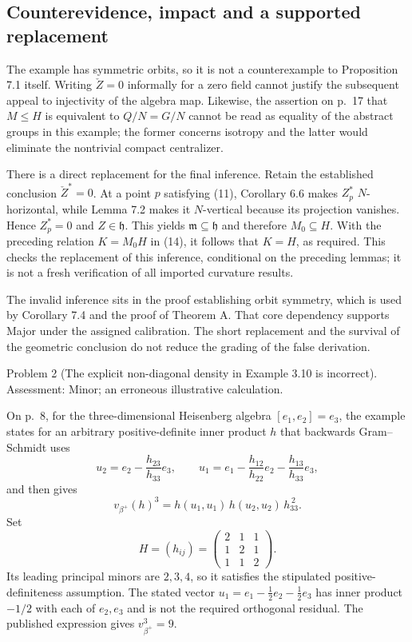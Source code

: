 \documentclass[10pt]{article}
\begin{document}
\subsection*{Counterevidence, impact and a supported replacement}
The example has symmetric orbits, so it is not a counterexample to Proposition 7.1 itself. Writing \(\check Z=0\) informally for a zero field cannot justify the subsequent appeal to injectivity of the algebra map. Likewise, the assertion on p. 17 that \(M\leq H\) is equivalent to \(Q/N=G/N\) cannot be read as equality of the abstract groups in this example; the former concerns isotropy and the latter would eliminate the nontrivial compact centralizer.\par
There is a direct replacement for the final inference. Retain the established conclusion \(\check Z^{*}=0\). At a point \(p\) satisfying (11), Corollary 6.6 makes \(Z_p^{*}\) \(N\)-horizontal, while Lemma 7.2 makes it \(N\)-vertical because its projection vanishes. Hence \(Z_p^{*}=0\) and \(Z\in\mathfrak h\). This yields \(\mathfrak m\subseteq\mathfrak h\) and therefore \(M_0\subseteq H\). With the preceding relation \(K=M_0H\) in (14), it follows that \(K=H\), as required. This checks the replacement of this inference, conditional on the preceding lemmas; it is not a fresh verification of all imported curvature results.\par
The invalid inference sits in the proof establishing orbit symmetry, which is used by Corollary 7.4 and the proof of Theorem A. That core dependency supports Major under the assigned calibration. The short replacement and the survival of the geometric conclusion do not reduce the grading of the false derivation.\par
Problem 2 (The explicit non-diagonal density in Example 3.10 is incorrect).  Assessment: Minor; an erroneous illustrative calculation.\par
On p. 8, for the three-dimensional Heisenberg algebra \([e_1,e_2]=e_3\), the example states for an arbitrary positive-definite inner product \(h\) that backwards Gram–Schmidt uses \[u_2=e_2-\frac{h_{23}}{h_{33}}e_3,\qquad
 u_1=e_1-\frac{h_{12}}{h_{22}}e_2-\frac{h_{13}}{h_{33}}e_3,\] and then gives \[v_{\beta^+}(h)^3=h(u_1,u_1)\,h(u_2,u_2)\,h_{33}^{\,2}.\] Set \[H=(h_{ij})=\begin{pmatrix}2&1&1\\1&2&1\\1&1&2\end{pmatrix}.\] Its leading principal minors are \(2,3,4\), so it satisfies the stipulated positive-definiteness assumption. The stated vector \(u_1=e_1-\tfrac12e_2-\tfrac12e_3\) has inner product \(-1/2\) with each of \(e_2,e_3\) and is not the required orthogonal residual. The published expression gives \(v_{\beta^+}^3=9\).\par
\end{document}
